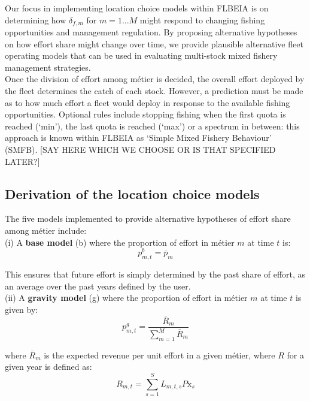 \documentclass[12pt, halfline, a4paper]{ouparticle}
\begin{document}
Our focus in implementing location choice models within FLBEIA is on
determining how $\delta_{f,m}$ for $m=1...M$ might respond to changing fishing
opportunities and management regulation. By proposing alternative hypotheses on how
effort share might change over time, we provide plausible alternative fleet
operating models that can be used in evaluating multi-stock mixed fishery management strategies.
\\

Once the division of effort among métier is decided, the overall effort deployed
by the fleet determines the catch of each stock. However, a prediction must be
made as to how much effort a fleet would deploy in response to the available
fishing opportunities. Optional rules include stopping fishing when the first
quota is reached (`min'), the last quota is reached (`max') or a spectrum in
between: this approach is known within FLBEIA as `Simple Mixed Fishery
Behaviour' (SMFB). [SAY HERE WHICH WE CHOOSE OR IS THAT SPECIFIED LATER?]

\subsection{Derivation of the location choice models}

The five models implemented to provide alternative hypotheses of effort share
among métier include:\\

(i) A \textbf{base model} (b) where the proportion of effort in métier $m$ at time
$t$ is:
\begin{equation}
p^{b}_{m,t} = \overline{p}_{m}
\end{equation}

This ensures that future effort is simply determined by the past share of
effort, as an average over the past years defined by the user. \\

(ii) A \textbf{gravity model} (g) where the proportion of effort in métier $m$ at
time $t$ is given by: 
\begin{equation}
p^{g}_{m,t} = \frac{\overline{R}_{m}}{\sum\limits_{m=1}^{M}\overline{R}_{m}} 
\end{equation}

where $\overline{R}_m$ is the expected revenue per unit effort in a given
métier, where $R$ for a given year is defined as: 
\begin{equation}
R_{m,t} =  \sum\limits_{s=1}^{S} L_{m,t,s} P\text{x}_{s} 
\label{eqn:ppue}
\end{equation}
\end{document}
